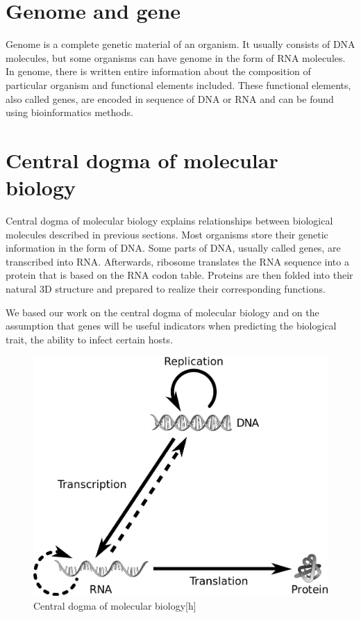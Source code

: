 \section{Genome and gene}
Genome is a complete genetic material of an organism.
It usually consists of DNA molecules, but some organisms can have genome in the form of RNA molecules.
In genome, there is written entire information about the composition of particular organism and functional elements included.
These functional elements, also called genes, are encoded in sequence of DNA or RNA and can be found using bioinformatics methods.

\section{Central dogma of molecular biology}
Central dogma of molecular biology explains relationships between biological molecules described in previous sections.
Most organisms store their genetic information in the form of DNA.
Some parts of DNA, usually called genes, are transcribed into RNA.
Afterwards, ribosome translates the RNA sequence into a protein that is based on the RNA codon table.
Proteins are then folded into their natural 3D structure and prepared to realize their corresponding functions.

We based our work on the central dogma of molecular biology and on the assumption that genes will be useful indicators when predicting the biological trait, the ability to infect certain hosts.

\begin{figure}[htp]
\includegraphics[width=\linewidth]{./images/central_dogma.png}
\centering
\caption{Central dogma of molecular biology[h]}
\end{figure}

